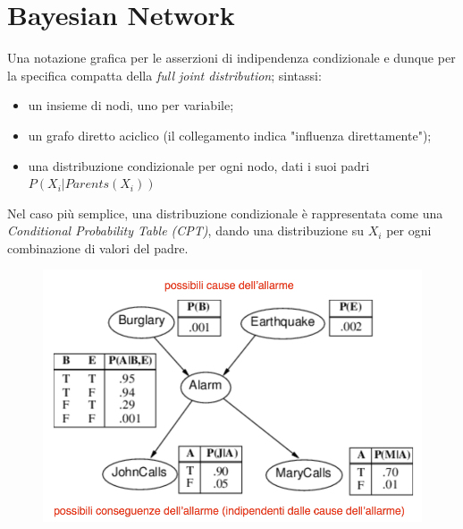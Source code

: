 \documentclass[a4paper, notitlepage, 9pt]{extreport}
\begin{document}
\chapter*{Bayesian Network}
Una notazione grafica per le asserzioni di indipendenza condizionale e dunque per la specifica compatta della \textit{full joint distribution}; sintassi:
\begin{multicols}{2}
	\begin{itemize}
		\item un insieme di nodi, uno per variabile;
		\item un grafo diretto aciclico (il collegamento indica "influenza direttamente");
		\item una distribuzione condizionale per ogni nodo, dati i suoi padri ~~$P(X_i | Parents(X_i))$
	\end{itemize}
	\noindent
	Nel caso più semplice, una distribuzione condizionale è rappresentata come una \textit{Conditional Probability Table (CPT)}, dando una distribuzione su $X_i$ per ogni combinazione di valori del padre.
	\columnbreak
	\begin{figure}[H]
		\centering
		\includegraphics[scale=0.42]{BN}
	\end{figure}
\end{multicols}
\end{document}
